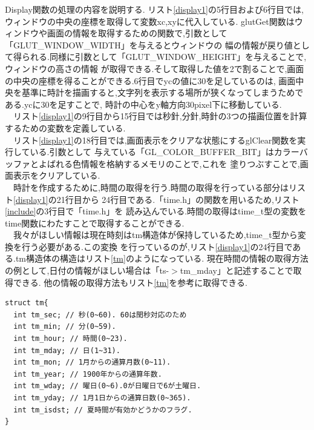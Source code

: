 \documentclass[a4j]{jarticle}
\begin{document}
            Display関数の処理の内容を説明する.     
            リスト\ref{display1}の5行目および6行目では,ウィンドウの中央の座標を取得して変数xc,xyに代入している.
              glutGet関数はウィンドウや画面の情報を取得するための関数で,引数として「GLUT\_WINDOW\_WIDTH」を与えるとウィンドウの
              幅の情報が戻り値として得られる.同様に引数として「GLUT\_WINDOW\_HEIGHT」を与えることで,ウィンドウの高さの情報
              が取得できる.そして取得した値を2で割ることで,画面の中央の座標を得ることができる.6行目でycの値に30を足しているのは,
              画面中央を基準に時計を描画すると,文字列を表示する場所が狭くなってしまうためである.ycに30を足すことで,
              時計の中心をy軸方向30pixel下に移動している.\\
              　リスト\ref{display1}の9行目から15行目では秒針,分針,時針の3つの描画位置を計算するための変数を定義している.\\
              　リスト\ref{display1}の18行目では,画面表示をクリアな状態にするglClear関数を実行している.引数として
              与えている「GL\_COLOR\_BUFFER\_BIT」はカラーバッファとよばれる色情報を格納するメモリのことで,これを
              塗りつぶすことで,画面表示をクリアしている.\\
              　時計を作成するために,時間の取得を行う.時間の取得を行っている部分はリスト\ref{display1}の21行目から
              24行目である.「time.h」の関数を用いるため,リスト\ref{include}の3行目で「time.h」を
              読み込んでいる.時間の取得はtime\_t型の変数をtime関数にわたすことで取得することができる.\\
              　我々がほしい情報は現在時刻はtm構造体が保持しているため,time\_t型から変換を行う必要がある.この変換
              を行っているのが,リスト\ref{display1}の24行目である.tm構造体の構造はリスト\ref{tm}のようになっている.
              現在時間の情報の取得方法の例として,日付の情報がほしい場合は「ts-$>$tm\_mday」と記述することで取得できる.
              他の情報の取得方法もリスト\ref{tm}を参考に取得できる.

    \begin{lstlisting}[basicstyle=\ttfamily\footnotesize, frame=single,label=tm,caption=tm構造体]
struct tm{
  int tm_sec; // 秒(0~60). 60は閏秒対応のため
  int tm_min; // 分(0~59).
  int tm_hour; // 時間(0~23).
  int tm_mday; // 日(1~31).
  int tm_mon; // 1月からの通算月数(0~11).
  int tm_year; // 1900年からの通算年数.
  int tm_wday; // 曜日(0~6).0が日曜日で6が土曜日.
  int tm_yday; // 1月1日からの通算日数(0~365).
  int tm_isdst; // 夏時間が有効かどうかのフラグ.
}
            \end{lstlisting}
\end{document}
